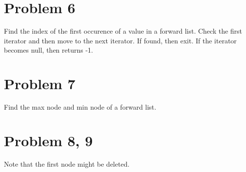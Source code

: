 \documentclass{article}
\begin{document}
  \section*{Problem 6}
  Find the index of the first occurence of a value in a forward list. Check the first iterator and then move to the next iterator. If found, then exit. If the iterator becomes null, then returns -1.
  
  \section*{Problem 7}
  Find the max node and min node of a forward list.
  
  \section*{Problem 8, 9}
  Note that the first node might be deleted.
  
  
\end{document}
